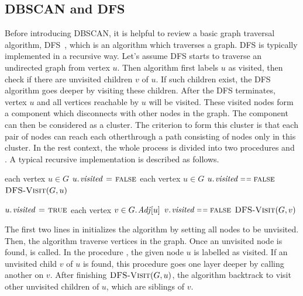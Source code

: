 \subsection{DBSCAN and DFS}
\label{subsec:DBSCANDFS}
Before introducing DBSCAN, it is helpful to review a basic graph traversal algorithm, DFS~\cite{cormen2009introduction}, which is an algorithm which traverses a graph. DFS is typically implemented in a recursive way. Let's assume DFS starts to traverse an undirected graph from vertex $u$. Then algorithm first labels $u$ as visited, then check if there are unvisited children $v$ of $u$. If such children exist, the DFS algorithm goes deeper by visiting these children. After the DFS terminates, vertex $u$ and all vertices reachable by $u$ will be visited. These visited nodes form a component which disconnects with other nodes in the graph. The component can then be considered as a cluster.  The criterion to form this cluster is that each pair of nodes can reach each otherthrough a path consisting of nodes only in this cluster. In the rest context, the whole process is divided into two procedures  and . A typical recursive implementation is described as follows. 

\begin{codebox}
\li \For each vertex $u \in G$
\li		\Do
			$\attrib{u}{visited} \gets \const{false}$
	\End
\li	\For each vertex $u \in G$
\li		\Do
		\If \(\attrib{u}{visited} \isequal \const{false}\)
\li			\Then
				$\textnormal{\scshape DFS-Visit}(G, u)$
		\End
	\End
\end{codebox}

\begin{codebox}
\li	$\attrib{u}{visited} \gets \const{true}$
\li	\For each vertex $v \in \attrib{G}{Adj}[u]$
\li	\Do
		\If	$\attrib{v}{visited} \isequal \const{false} $
\li			\Then
				$\textnormal{\scshape DFS-Visit}(G, v)$
		\End
	\End
\end{codebox}

The first two lines in  initializes the algorithm by setting all nodes to be unvisited. Then, the algorithm traverse vertices in the graph. Once an unvisited node is found,  is called. In the procedure , the given node $u$ is labelled as visited. If an unvisited child $v$ of $u$ is found, this procedure goes one layer deeper by calling another  on $v$. After finishing $\textnormal{\scshape DFS-Visit}(G, u)$, the algorithm backtrack to visit other unvisited children of $u$, which are siblings of $v$.

